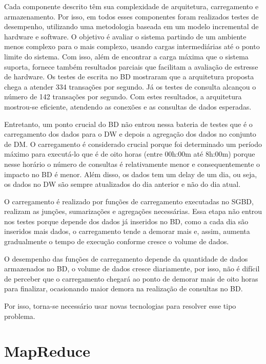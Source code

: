 \documentclass[a4paper,12pt]{article}
\begin{document}

Cada componente descrito têm sua complexidade de arquitetura, carregamento e
armazenamento. Por isso, em todos esses componentes foram realizados testes de
desempenho, utilizando uma metodologia baseada em um modelo incremental de
hardware e software. O objetivo é avaliar o sistema partindo de um ambiente
menos complexo para o mais complexo, usando cargas intermediárias até o ponto
limite do sistema. Com isso, além de encontrar a carga máxima que o sistema
suporta, fornece também resultados parciais que facilitam a avaliação de
estresse de hardware. Os testes de escrita no BD mostraram que a arquitetura
proposta chega a atender 334 transações por segundo. Já os testes de consulta
alcançou o número de 142 transações por segundo. Com estes resultados, a
arquitetura mostrou-se eficiente, atendendo as conexões e as consultas de dados
esperadas.

Entretanto, um ponto crucial do BD não entrou nessa bateria de testes que é o
carregamento dos dados para o DW e depois a agregação dos dados no conjunto de
DM. O carregamento é considerado crucial porque foi determinado um período máximo
para executá-lo que é de oito horas (entre 00h:00m até 8h:00m) porque nesse horário
o número de consultas é relativamente menor e consequentemente o impacto no BD é
menor. Além disso, os dados tem um delay de um dia, ou seja, os dados no DW são
sempre atualizados do dia anterior e não do dia atual. 

O carregamento é realizado por funções de carregamento executadas no SGBD,
realizam as junções, sumarizações e agregações necessárias. Essa etapa não
entrou nos testes porque depende dos dados já inseridos no BD, como a cada dia
são inseridos mais dados, o carregamento tende a demorar mais e, assim, aumenta
gradualmente o tempo de execução conforme cresce o volume de dados.

O desempenho das funções de carregamento depende da quantidade de dados armazenados
no BD, o volume de dados cresce diariamente, por isso, não é difícil de perceber
que o carregamento chegará ao ponto de demorar mais de oito horas para finalizar,
ocasionando maior demora na realização de consultas no BD.

Por isso, torna-se necessário usar novas tecnologias para resolver esse tipo
problema.


\section{\textbf{MapReduce}}
\end{document}
